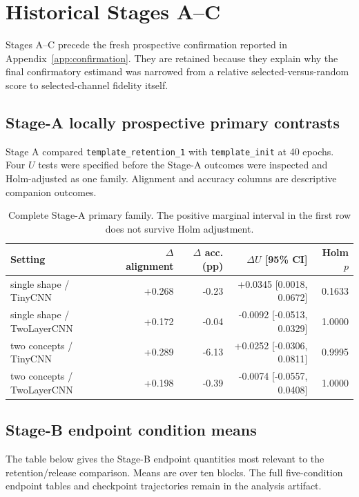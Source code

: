 \section{Historical Stages A--C}\label{app:historical}

Stages A--C precede the fresh prospective confirmation reported in Appendix~\ref{app:confirmation}. They are retained because they explain why the final confirmatory estimand was narrowed from a relative selected-versus-random score to selected-channel fidelity itself.

\subsection{Stage-A locally prospective primary contrasts}\label{app:stage-a}

Stage A compared \texttt{template\_retention\_1} with \texttt{template\_init} at 40 epochs. Four $U$ tests were specified before the Stage-A outcomes were inspected and Holm-adjusted as one family. Alignment and accuracy columns are descriptive companion outcomes.

\begin{table}[h]
\centering
\small
\begin{tabular}{lrrrr}
\toprule
Setting & $\Delta$ alignment & $\Delta$ acc. (pp) & $\Delta U$ [95\% CI] & Holm $p$ \\
\midrule
single shape / TinyCNN & +0.268 & -0.23 & +0.0345 [0.0018, 0.0672] & 0.1633 \\
single shape / TwoLayerCNN & +0.172 & -0.04 & -0.0092 [-0.0513, 0.0329] & 1.0000 \\
two concepts / TinyCNN & +0.289 & -6.13 & +0.0252 [-0.0306, 0.0811] & 0.9995 \\
two concepts / TwoLayerCNN & +0.198 & -0.39 & -0.0074 [-0.0557, 0.0408] & 1.0000 \\
\bottomrule
\end{tabular}
\caption{Complete Stage-A primary family. The positive marginal interval in the first row does not survive Holm adjustment.}
\label{tab:stage-a-primary}
\end{table}

\subsection{Stage-B endpoint condition means}\label{app:stage-b-endpoints}

The table below gives the Stage-B endpoint quantities most relevant to the retention/release comparison. Means are over ten blocks. The full five-condition endpoint tables and checkpoint trajectories remain in the analysis artifact.

